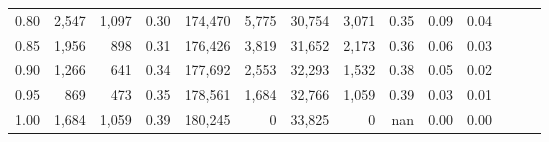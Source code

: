 \begin{tabular}{rrrrrrrrrrrrrr}
0.80 &   2,547 &  1,097 &  0.30 &  174,470 &    5,775 &  30,754 &   3,071 &  0.35 &  0.09 &      0.04 \\
0.85 &   1,956 &    898 &  0.31 &  176,426 &    3,819 &  31,652 &   2,173 &  0.36 &  0.06 &      0.03 \\
0.90 &   1,266 &    641 &  0.34 &  177,692 &    2,553 &  32,293 &   1,532 &  0.38 &  0.05 &      0.02 \\
0.95 &     869 &    473 &  0.35 &  178,561 &    1,684 &  32,766 &   1,059 &  0.39 &  0.03 &      0.01 \\
1.00 &   1,684 &  1,059 &  0.39 &  180,245 &        0 &  33,825 &       0 &   nan &  0.00 &      0.00 \\
\bottomrule
\end{tabular}
